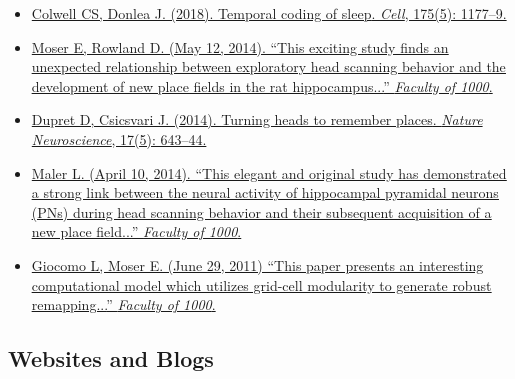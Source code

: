 \documentclass[10pt]{article}
\newcommand{\itemtitle}[1]{{\color{hopkinsblue}\ul{#1}}}
\begin{document}
\begin{itemize}
  \item \href{https://doi.org/10.1016/j.cell.2018.10.047}
    {Colwell CS, Donlea J. (2018). \itemtitle{Temporal coding of sleep}. \emph{Cell}, 175(5): 1177--9.}
  \item \href{http://f1000prime.com/718333676#eval793494783}
    {Moser E, Rowland D. (May 12, 2014). ``\itemtitle{This exciting study finds
    an unexpected relationship between exploratory head scanning behavior and the
    development of new place fields in the rat hippocampus...}” \emph{Faculty of
    1000}.}
  \item \href{https://doi.org/10.1038/nn.3700}
    {Dupret D, Csicsvari J. (2014). \itemtitle{Turning heads to remember
    places}. \emph{Nature Neuroscience}, 17(5): 643--44.}
  \item \href{http://f1000prime.com/718333676#eval793493493}
    {Maler L. (April 10, 2014). ``\itemtitle{This elegant and original study has
    demonstrated a strong link between the neural activity of hippocampal pyramidal
    neurons (PNs) during head scanning behavior and their subsequent acquisition of
    a new place field...}'' \emph{Faculty of 1000}.}
  \item \href{http://f1000.com/11553956}
    {Giocomo L, Moser E. (June 29, 2011) ``\itemtitle{This paper presents an
    interesting computational model which utilizes grid-cell modularity to generate
    robust remapping...}'' \emph{Faculty of 1000}.}
\end{itemize}

\subsection*{Websites and Blogs}
\end{document}
